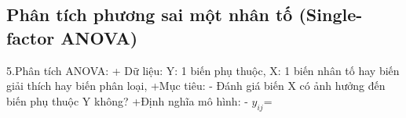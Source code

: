 \subsection{Phân tích phương sai một nhân tố (Single-factor ANOVA)}
5.Phân tích ANOVA:
+ Dữ liệu: 
	Y: 1 biến phụ thuộc,
	X: 1 biến nhân tố hay biến giải thích hay biến phân loại,
+Mục tiêu:
	- Đánh giá biến X có ảnh hưởng đến biến phụ thuộc Y không?
+Định nghĩa mô hình:
	- $y_{ij}$=
